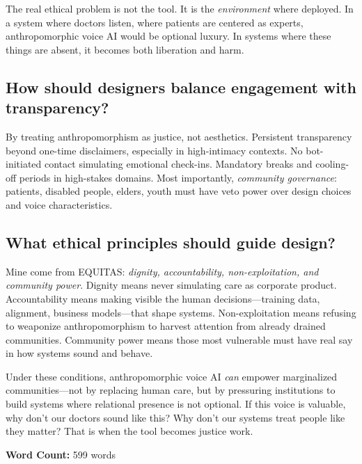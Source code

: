 \documentclass[12pt,twoside]{article}
\begin{document}
The real ethical problem is not the tool. It is the \emph{environment} where deployed. In a system where doctors listen, where patients are centered as experts, anthropomorphic voice AI would be optional luxury. In systems where these things are absent, it becomes both liberation and harm.

\subsection*{How should designers balance engagement with transparency?}

By treating anthropomorphism as justice, not aesthetics. Persistent transparency beyond one-time disclaimers, especially in high-intimacy contexts. No bot-initiated contact simulating emotional check-ins. Mandatory breaks and cooling-off periods in high-stakes domains. Most importantly, \emph{community governance}: patients, disabled people, elders, youth must have veto power over design choices and voice characteristics.

\subsection*{What ethical principles should guide design?}

Mine come from EQUITAS: \emph{dignity, accountability, non-exploitation, and community power}. Dignity means never simulating care as corporate product. Accountability means making visible the human decisions—training data, alignment, business models—that shape systems. Non-exploitation means refusing to weaponize anthropomorphism to harvest attention from already drained communities. Community power means those most vulnerable must have real say in how systems sound and behave.

Under these conditions, anthropomorphic voice AI \emph{can} empower marginalized communities—not by replacing human care, but by pressuring institutions to build systems where relational presence is not optional. If this voice is valuable, why don't our doctors sound like this? Why don't our systems treat people like they matter? That is when the tool becomes justice work.

\vfill
\noindent\centering\footnotesize\textbf{Word Count:} 599 words
\end{document}
